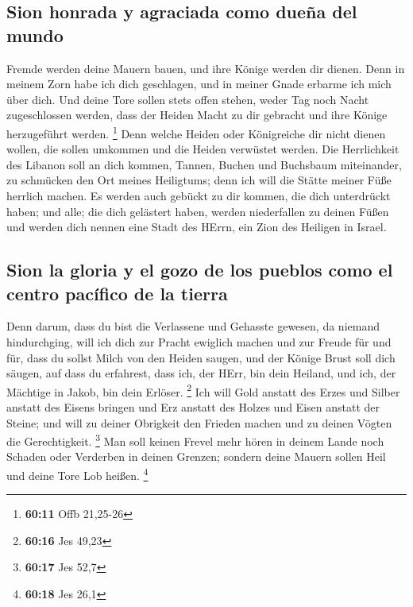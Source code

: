\hypertarget{sion-honrada-y-agraciada-como-dueuxf1a-del-mundo}{%
\subsection{Sion honrada y agraciada como dueña del
mundo}\label{sion-honrada-y-agraciada-como-dueuxf1a-del-mundo}}

 Fremde werden deine Mauern bauen, und ihre Könige werden
dir dienen. Denn in meinem Zorn habe ich dich geschlagen, und in meiner
Gnade erbarme ich mich über dich.  Und deine Tore sollen
stets offen stehen, weder Tag noch Nacht zugeschlossen werden, dass der
Heiden Macht zu dir gebracht und ihre Könige herzugeführt werden.
\footnote{\textbf{60:11} Offb 21,25-26}  Denn welche
Heiden oder Königreiche dir nicht dienen wollen, die sollen umkommen und
die Heiden verwüstet werden.  Die Herrlichkeit des
Libanon soll an dich kommen, Tannen, Buchen und Buchsbaum miteinander,
zu schmücken den Ort meines Heiligtums; denn ich will die Stätte meiner
Füße herrlich machen.  Es werden auch gebückt zu dir
kommen, die dich unterdrückt haben; und alle; die dich gelästert haben,
werden niederfallen zu deinen Füßen und werden dich nennen eine Stadt
des HErrn, ein Zion des Heiligen in Israel.

\hypertarget{sion-la-gloria-y-el-gozo-de-los-pueblos-como-el-centro-pacuxedfico-de-la-tierra}{%
\subsection{Sion la gloria y el gozo de los pueblos como el centro
pacífico de la
tierra}\label{sion-la-gloria-y-el-gozo-de-los-pueblos-como-el-centro-pacuxedfico-de-la-tierra}}

 Denn darum, dass du bist die Verlassene und Gehasste
gewesen, da niemand hindurchging, will ich dich zur Pracht ewiglich
machen und zur Freude für und für,  dass du sollst Milch
von den Heiden saugen, und der Könige Brust soll dich säugen, auf dass
du erfahrest, dass ich, der HErr, bin dein Heiland, und ich, der
Mächtige in Jakob, bin dein Erlöser. \footnote{\textbf{60:16} Jes 49,23}
 Ich will Gold anstatt des Erzes und Silber anstatt des
Eisens bringen und Erz anstatt des Holzes und Eisen anstatt der Steine;
und will zu deiner Obrigkeit den Frieden machen und zu deinen Vögten die
Gerechtigkeit. \footnote{\textbf{60:17} Jes 52,7}  Man
soll keinen Frevel mehr hören in deinem Lande noch Schaden oder
Verderben in deinen Grenzen; sondern deine Mauern sollen Heil und deine
Tore Lob heißen. \footnote{\textbf{60:18} Jes 26,1}

